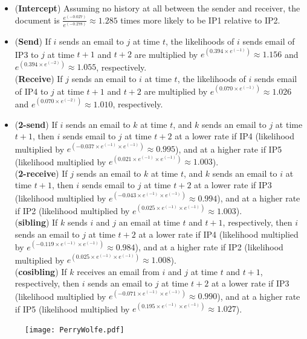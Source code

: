 \documentclass[a4paper]{article}
\begin{document}
\begin{itemize}
	\item (\textbf{Intercept}) Assuming no history at all between the sender and receiver, the document is  $\frac{e^{(-0.027)}}{e^{(-0.278)}}\approx 1.285$ times more likely to be IP1 relative to IP2.
	\item (\textbf{Send}) If $i$ sends an email to $j$ at time $t$, the likelihoods of $i$ sends email of IP3 to $j$ at time $t+1$ and $t+2$ are multiplied by $e^{(0.394\times e^{(-1)})}\approx 1.156$ and $e^{(0.394\times e^{(-2)})}\approx 1.055$, respectively. \\ 
	(\textbf{Receive}) If $j$ sends an email to $i$ at time $t$, the likelihoods of $i$ sends email of IP4 to $j$ at time $t+1$ and $t+2$ are multiplied by $e^{(0.070\times e^{(-1)})}\approx 1.026$ and $e^{(0.070\times e^{(-2)})}\approx 1.010$, respectively.
	\item (\textbf{2-send}) If $i$ sends an email to $k$ at time $t$, and $k$ sends an email to $j$ at time $t+1$, then $i$ sends email to $j$ at time $t+2$ at a lower rate if IP4 (likelihood multiplied by $e^{(-0.037\times e^{(-1)}\times e^{(-1)})}\approx 0.995$), and at a higher rate if IP5 (likelihood multiplied by $e^{(0.021\times e^{(-1)}\times e^{(-1)})}\approx 1.003$).\\
	(\textbf{2-receive}) If $j$ sends an email to $k$ at time $t$, and $k$ sends an email to $i$ at time $t+1$, then $i$ sends email to $j$ at time $t+2$ at a lower rate if IP3 (likelihood multiplied by $e^{(-0.043\times e^{(-1)}\times e^{(-1)})}\approx 0.994$), and at a higher rate if IP2 (likelihood multiplied by $e^{(0.025\times e^{(-1)}\times e^{(-1)})}\approx 1.003$).\\
	(\textbf{sibling}) If $k$ sends $i$ and $j$ an email at time $t$ and $t+1$, respectively, then $i$ sends an email to $j$ at time $t+2$ at a lower rate if IP4 (likelihood multiplied by $e^{(-0.119\times e^{(-1)}\times e^{(-1)})}\approx 0.984$), and at a higher rate if IP2 (likelihood multiplied by $e^{(0.025\times e^{(-1)}\times e^{(-1)})}\approx 1.008$).\\
	(\textbf{cosibling}) If $k$ receives an email from $i$ and $j$ at time $t$ and $t+1$, respectively, then $i$ sends an email to $j$ at time $t+2$ at a lower rate if IP3 (likelihood multiplied by $e^{(-0.071\times e^{(-1)}\times e^{(-1)})}\approx 0.990$), and at a higher rate if IP5 (likelihood multiplied by $e^{(0.195\times e^{(-1)}\times e^{(-1)})}\approx 1.027$).
\end{itemize}
\begin{figure}[ht]
	\centering
	\texttt{[image: PerryWolfe.pdf]} 
	\label{fig:networkplot}
\end{figure}
\end{document}
